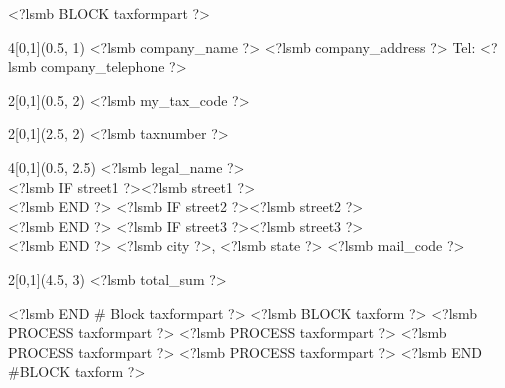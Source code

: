 \setlength{\parindent}{0pt}
<?lsmb BLOCK taxformpart ?>
\begin{textblock}{4}[0,1](0.5, 1)
<?lsmb company_name ?>
<?lsmb company_address ?>
Tel: <?lsmb company_telephone ?>
\end{textblock}

\begin{textblock}{2}[0,1](0.5, 2)
<?lsmb my_tax_code ?>
\end{textblock}

\begin{textblock}{2}[0,1](2.5, 2)
<?lsmb taxnumber ?>
\end{textblock}

\begin{textblock}{4}[0,1](0.5, 2.5)
<?lsmb legal_name ?>\\
<?lsmb IF street1 ?><?lsmb street1 ?>\\ <?lsmb END ?>
<?lsmb IF street2 ?><?lsmb street2 ?>\\ <?lsmb END ?>
<?lsmb IF street3 ?><?lsmb street3 ?>\\ <?lsmb END ?>
<?lsmb city ?>, <?lsmb state ?> <?lsmb mail_code ?>
\end{textblock}

\begin{textblock}{2}[0,1](4.5, 3)
<?lsmb total_sum ?>
\end{textblock}
<?lsmb END # Block taxformpart ?>
<?lsmb BLOCK taxform ?>
<?lsmb PROCESS taxformpart ?>
\clearpage
<?lsmb PROCESS taxformpart ?>
\clearpage
<?lsmb PROCESS taxformpart ?>
\clearpage
<?lsmb PROCESS taxformpart ?>
\clearpage
<?lsmb END #BLOCK taxform ?>
